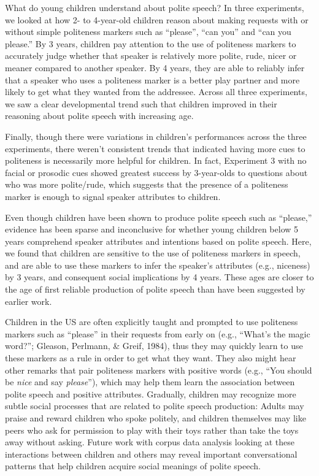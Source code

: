 \documentclass[10pt, letterpaper]{article}
\begin{document}
What do young children understand about polite speech? In three
experiments, we looked at how 2- to 4-year-old children reason about
making requests with or without simple politeness markers such as
``please'', ``can you'' and ``can you please.'' By 3 years, children pay
attention to the use of politeness markers to accurately judge whether
that speaker is relatively more polite, rude, nicer or meaner compared
to another speaker. By 4 years, they are able to reliably infer that a
speaker who uses a politeness marker is a better play partner and more
likely to get what they wanted from the addressee. Across all three
experiments, we saw a clear developmental trend such that children
improved in their reasoning about polite speech with increasing age.

Finally, though there were variations in children's performances across
the three experiments, there weren't consistent trends that indicated
having more cues to politeness is necessarily more helpful for children.
In fact, Experiment 3 with no facial or prosodic cues showed greatest
success by 3-year-olds to questions about who was more polite/rude,
which suggests that the presence of a politeness marker is enough to
signal speaker attributes to children.

Even though children have been shown to produce polite speech such as
``please,'' evidence has been sparse and inconclusive for whether young
children below 5 years comprehend speaker attributes and intentions
based on polite speech. Here, we found that children are sensitive to
the use of politeness markers in speech, and are able to use these
markers to infer the speaker's attributes (e.g., niceness) by 3 years,
and consequent social implications by 4 years. These ages are closer to
the age of first reliable production of polite speech than have been
suggested by earlier work.

Children in the US are often explicitly taught and prompted to use
politeness markers such as ``please'' in their requests from early on
(e.g., ``What's the magic word?''; Gleason, Perlmann, \& Greif, 1984),
thus they may quickly learn to use these markers as a rule in order to
get what they want. They also might hear other remarks that pair
politeness markers with positive words (e.g., ``You should be
\emph{nice} and say \emph{please}''), which may help them learn the
association between polite speech and positive attributes. Gradually,
children may recognize more subtle social processes that are related to
polite speech production: Adults may praise and reward children who
spoke politely, and children themselves may like peers who ask for
permission to play with their toys rather than take the toys away
without asking. Future work with corpus data analysis looking at these
interactions between children and others may reveal important
conversational patterns that help children acquire social meanings of
polite speech.
\end{document}
